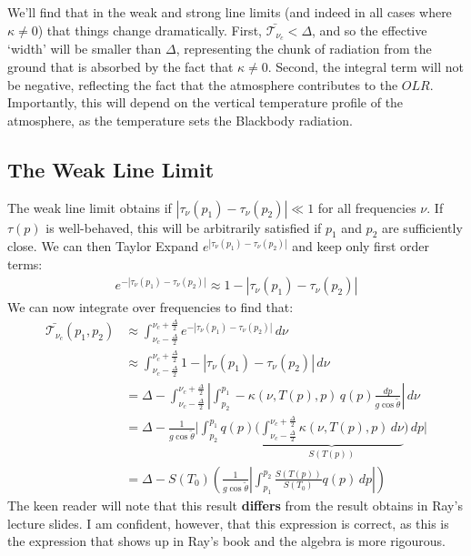 We'll find that in the weak and strong line limits (and indeed in all cases where $\kappa\neq0$) that things change dramatically. First, $\bar{\mathcal{T}_{\nu_c}}<\Delta$, and so the effective `width' will be smaller than $\Delta$, representing the chunk of radiation from the ground that is absorbed by the fact that $\kappa\neq0$. Second, the integral term will not be negative, reflecting the fact that the atmosphere contributes to the $OLR$. Importantly, this will depend on the vertical temperature profile of the atmosphere, as the temperature sets the Blackbody radiation.

\subsection{The Weak Line Limit}

The weak line limit obtains if $|\tau_\nu(p_1)-\tau_\nu(p_2)|\ll 1$ for all frequencies $\nu$. If $\tau(p)$ is well-behaved, this will be arbitrarily satisfied if $p_1$ and $p_2$ are sufficiently close. We can then Taylor Expand $e^{|\tau_\nu(p_1)-\tau_\nu(p_2)|}$ and keep only first order terms:
\begin{align*}
    e^{-|\tau_\nu(p_1)-\tau_\nu(p_2)|}\approx1-|\tau_\nu(p_1)-\tau_\nu(p_2)|
\end{align*}
We can now integrate over frequencies to find that:
\begin{align*}
    \bar{\mathcal{T}_{\nu_c}}(p_1,p_2)&\approx\int_{\nu_c-\frac{\Delta}{2}}^{\nu_c+\frac{\Delta}{2}} e^{-|\tau_\nu(p_1)-\tau_\nu(p_2)|}\,d\nu\\
    &\approx\int_{\nu_c-\frac{\Delta}{2}}^{\nu_c+\frac{\Delta}{2}} 1-|\tau_\nu(p_1)-\tau_\nu(p_2)|\,d\nu\\
    &=\Delta-\int_{\nu_c-\frac{\Delta}{2}}^{\nu_c+\frac{\Delta}{2}}
    \left|
        \int_{p_2}^{p_1}-\kappa(\nu,T(p),p)\,q(p)\frac{dp}{g\cos\tilde{\theta}}
    \right|
    \,d\nu
    \\
    &=\Delta-
    \frac{1}{g\cos\tilde{\theta}}
    \biggl|
        \int_{p_2}^{p_1}q(p)
        \biggl(\underbrace{ 
            \int_{\nu_c-\frac{\Delta}{2}}^{\nu_c+\frac{\Delta}{2}}\kappa(\nu,T(p),p)
            \,d\nu
            }_{S(T(p))}
        \biggr)
        \,dp
    \biggr|
    \\
    &=\Delta-S(T_0)\left( \frac{1}{g\cos\tilde{\theta}}\left|\int_{p_1}^{p_2}\frac{S(T(p))}{S(T_0)}q(p)\,dp\right| \right)
\end{align*}
The keen reader will note that this result \textbf{differs} from the result obtains in Ray's lecture slides. I am confident, however, that this expression is correct, as this is the expression that shows up in Ray's book \cite{Ray} and the algebra is more rigourous.

